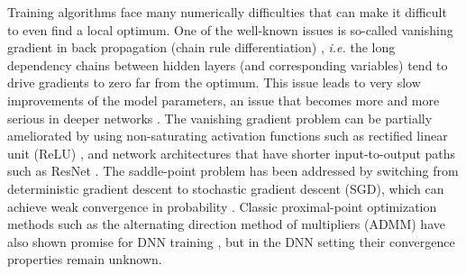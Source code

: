 \documentclass{article}
\def\ie{\emph{i.e. }}
\begin{document}
Training algorithms face many numerically difficulties that can make it difficult to even find a local optimum. One of the well-known issues is so-called vanishing gradient in back propagation (chain rule differentiation) \cite{chapter-gradient-flow-2001}, \ie the long dependency chains between hidden layers (and corresponding variables) tend to drive gradients to zero far from the optimum.  This issue leads to very slow improvements of the model parameters, an issue that becomes more and more serious in deeper networks \cite{glorot2010understanding}. The vanishing gradient problem can be partially ameliorated by using non-saturating activation functions such as rectified linear unit (ReLU) \cite{lecun2015deep}, and network architectures that have shorter input-to-output paths such as ResNet \cite{he2016deep}. %
The saddle-point problem has been addressed by switching from deterministic gradient descent to stochastic gradient descent (SGD), which can achieve weak convergence in probability \cite{bottou2016optimization}. %
 Classic proximal-point optimization methods such as the alternating direction method of multipliers (ADMM) have also shown promise for DNN training \cite{taylor2016training,Zhang_2016_CVPR}, but in the DNN setting their convergence properties remain unknown.  
	
	
\end{document}

